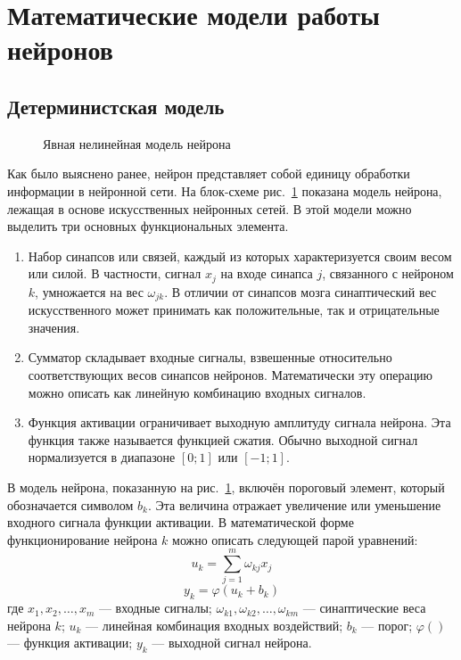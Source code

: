 \section{Математические модели работы нейронов}
\subsection{Детерминистская модель}
\begin{figure}[h]
\caption{Явная нелинейная модель нейрона}
\label{ris:BlockScheme}
\end{figure}
Как было выяснено ранее, нейрон представляет собой единицу обработки информации в нейронной сети. 
На блок-схеме рис.~\ref{ris:BlockScheme} показана модель нейрона, лежащая в основе искусственных нейронных сетей.
В этой модели можно выделить три основных функциональных элемента.
\begin{enumerate}
\item Набор синапсов или связей, каждый из которых характеризуется своим весом или силой.
В частности, сигнал $x_j$ на входе синапса $j$, связанного с нейроном $k$, умножается на вес $\omega_{jk}$.
В отличии от синапсов мозга синаптический вес искусственного может принимать как положительные, так и отрицательные значения. 
\item Сумматор складывает входные сигналы, взвешенные относительно соответствующих весов синапсов нейронов.
Математически эту операцию можно описать как линейную комбинацию входных сигналов.
\item Функция активации ограничивает выходную амплитуду сигнала нейрона.
Эта функция также называется функцией сжатия.
Обычно выходной сигнал нормализуется в диапазоне $[0;1]$ или $[-1;1]$.
\end{enumerate}
В модель нейрона, показанную на рис.~\ref{ris:BlockScheme}, включён пороговый элемент, который обозначается символом $b_k$.
Эта величина отражает увеличение или уменьшение входного сигнала функции активации.
В математической форме функционирование нейрона $k$ можно описать следующей парой уравнений:
\begin{equation}
u_k = \sum_{j=1}^{m} \omega_{kj}x_j
\end{equation}
\begin{equation}
y_k = \varphi (u_k + b_k)
\end{equation}
где $x_1,x_2,\dots,x_m$ --- входные сигналы;
$\omega_{k1},\omega_{k2},\dots,\omega_{km}$ --- синаптические веса нейрона $k$;
$u_k$ --- линейная комбинация входных воздействий;
$b_k$ --- порог;
$\varphi()$ --- функция активации;
$y_k$ --- выходной сигнал нейрона.\cite{NejronnyeSeti}
